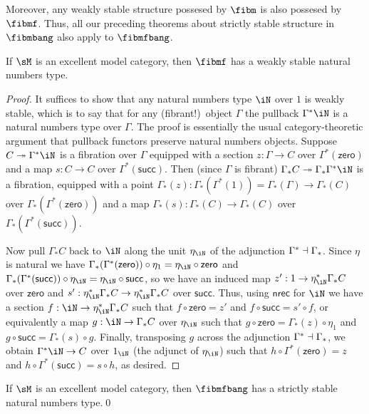 \documentclass{amsart}
\let\N\iN
\def\zero{\mathsf{zero}}
\def\succ{\mathsf{succ}}
\def\nrec{\mathsf{nrec}}
\begin{document}
Moreover, any weakly stable structure possesed by $\fibm$ is also possesed by $\fibmf$.
Thus, all our preceding theorems about strictly stable structure in $\fibmbang$ also apply to $\fibmfbang$.

\begin{thm}\label{thm:nat-stable}
  If $\sM$ is an excellent model category, then $\fibmf$ has a weakly stable natural numbers type.
\end{thm}
\begin{proof}
  It suffices to show that any natural numbers type $\N$ over $1$ is weakly stable, which is to say that for any (fibrant!)\ object $\Gamma$ the pullback $\Gamma^* \N$ is a natural numbers type over $\Gamma$.
  The proof is essentially the usual category-theoretic argument that pullback functors preserve natural numbers objects.
  Suppose $C\fib \Gamma^* \N$ is a fibration over $\Gamma$ equipped with a section $z:\Gamma\to C$ over $\Gamma^*(\zero)$ and a map $s:C\to C$ over $\Gamma^*(\succ)$.
  Then (since $\Gamma$ is fibrant) $\Gamma_* C \fib \Gamma_* \Gamma^* \N$ is a fibration, equipped with a point $\Gamma_*(z) : \Gamma_*(\Gamma^*(1)) = \Gamma_*(\Gamma) \to \Gamma_*(C)$ over $\Gamma_*(\Gamma^*(\zero))$ and a map $\Gamma_*(s):\Gamma_*(C)\to\Gamma_*(C)$ over $\Gamma_*(\Gamma^*(\succ))$.

  Now pull $\Gamma_* C$ back to $\N$ along the unit $\eta_\N$ of the adjunction $\Gamma^* \dashv \Gamma_*$.
  Since $\eta$ is natural we have $\Gamma_*(\Gamma^*(\zero)) \circ \eta_1 = \eta_\N \circ \zero$ and $\Gamma_*(\Gamma^*(\succ)) \circ \eta_\N = \eta_\N \circ \succ$, so we have an induced map $z' : 1 \to \eta_\N^*\Gamma_*C$ over $\zero$ and $s':\eta_\N^*\Gamma_*C \to \eta_\N^*\Gamma_*C$ over $\succ$.
  Thus, using $\nrec$ for $\N$ we have a section $f:\N\to \eta_\N^*\Gamma_* C$ such that $f \circ \zero = z'$ and $f\circ \succ = s' \circ f$, or equivalently a map $g:\N \to \Gamma_*C$ over $\eta_\N$ such that $g\circ \zero = \Gamma_*(z) \circ \eta_1$ and $g\circ \succ = \Gamma_*(s) \circ g$.
  Finally, transposing $g$ across the adjunction $\Gamma^* \dashv \Gamma_*$, we obtain $\Gamma^* \N \to C$ over $1_\N$ (the adjunct of $\eta_\N$) such that $h\circ \Gamma^*(\zero) = z$ and $h\circ \Gamma^*(\succ) = s\circ h$, as desired.
\end{proof}

\begin{cor}
  If $\sM$ is an excellent model category, then $\fibmfbang$ has a strictly stable natural numbers type.\qed
\end{cor}
\end{document}

